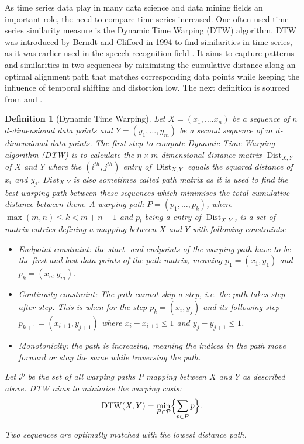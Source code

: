\documentclass[pdftex,12pt,a4paper]{report}
\newtheorem{definition}{Definition}[section]
\begin{document}
As time series data play in many data science and data mining fields an important role, the need to compare time series increased.
One often used time series similarity measure is the Dynamic Time Warping (DTW) algorithm.
DTW was introduced by Berndt and Clifford in 1994 to find similarities in time series, as it was earlier used in the speech recognition field \cite{introduction-dtw}.
It aims to capture patterns and similarities in two sequences by minimising the cumulative distance along an optimal alignment path that matches corresponding data points while keeping the influence of temporal shifting and distortion low.
The next definition is sourced from \cite{weighted-dtw} and \cite{scaling-dtw}.
\begin{definition}[Dynamic Time Warping] \label{dtw}
    Let $X = (x_1, \dots. x_n)$ be a sequence of $n$ $d$-dimensional data points and $Y = (y_1, \dots, y_m)$ be a second sequence of $m$ $d$-dimensional data points.
    The first step to compute Dynamic Time Warping algorithm (DTW) is to calculate the $n \times m$-dimensional distance matrix $\operatorname{Dist}_{X, Y}$ of $X$ and $Y$ where the $(i^{th}, j^{th})$ entry of $\operatorname{Dist}_{X, Y}$ equals the squared distance of $x_i$ and $y_j$.
    $Dist_{X, Y}$ is also sometimes called path matrix as it is used to find the best warping path between these sequences which minimises the total cumulative distance between them.
    A warping path $P = (p_1, \dots, p_k)$, where $\max (m, n) \leq k < m + n - 1$ and $p_l$ being a entry of $\operatorname{Dist}_{X, Y}$, is a set of matrix entries defining a mapping between $X$ and $Y$ with following constraints:
    \begin{itemize}
        \item Endpoint constraint: the start- and endpoints of the warping path have to be the first and last data points of the path matrix, meaning $p_1 = (x_1, y_1)$ and $p_k = (x_n, y_m)$.
        \item Continuity constraint: The path cannot skip a step, i.e. the path takes step after step.
        This is when for the step $p_k = (x_i, y_j)$ and its following step $p_{k + 1} = (x_{i + 1}, y_{j + 1})$ where $x_i - x_{i +1} \leq 1$ and $y_j - y_{j + 1} \leq 1$.
        \item Monotonicity: the path is increasing, meaning the indices in the path move forward or stay the same while traversing the path.
    \end{itemize}
    Let $\mathcal{P}$ be the set of all warping paths $P$ mapping between $X$ and $Y$ as described above.
    DTW aims to minimise the warping costs:
    \begin{align*}
        \operatorname{DTW}(X, Y) = \min_{P \in \mathcal{P}} \Bigl \{ \sum_{p \in P} p \Bigr \}. 
    \end{align*}
    
    Two sequences are optimally matched with the lowest distance path.
\end{definition}
\end{document}
